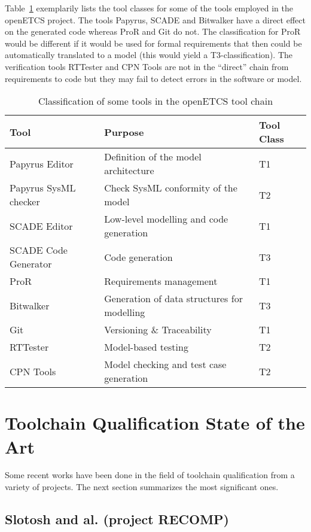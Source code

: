 Table~\ref{tab:oetcs_tool_classification} exemplarily lists the tool classes for some of the tools employed in the openETCS project. The tools Papyrus, SCADE and Bitwalker have a direct effect on the generated code whereas ProR and Git do not. The classification for ProR would be different if it would be used for formal requirements that then could be automatically translated to a model (this would yield a T3-classification). The verification tools RTTester and CPN Tools are not in the ``direct'' chain from requirements to code but they may fail to detect errors in the software or model.

\begin{table}[h]
\begin{center}
\begin{tabular}{lll}
Tool&Purpose&Tool Class\\\hline
Papyrus Editor &Definition of the model architecture&T1\\
Papyrus SysML checker & Check SysML conformity of the model &T2\\
SCADE Editor &Low-level modelling and code generation&T1\\
SCADE Code Generator & Code generation&T3\\
ProR&Requirements management&T1\\
Bitwalker&Generation of data structures for modelling&T3\\
Git&Versioning \& Traceability&T1\\
RTTester&Model-based testing&T2\\
CPN Tools&Model checking and test case generation&T2\\
\end{tabular}
\end{center}
\caption{Classification of some tools in the openETCS tool chain}
\label{tab:oetcs_tool_classification}
\end{table}
 
\section{Toolchain Qualification State of the Art}
\label{sec-1-2}
Some recent works have been done in the field of toolchain
qualification from a variety of projects. The next section summarizes
the most significant ones.

\subsection{Slotosh and al. (project RECOMP)}
\label{sec:slotosh-approach}


